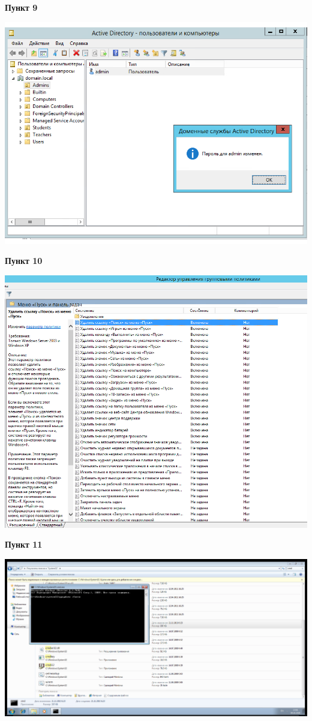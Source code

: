 \documentclass[a4paper,14pt]{extarticle}
\begin{document}
    \newpage
    \textbf{Пункт 9}
    \begin{center}
        \includegraphics[scale=0.6]{9}
    \end{center}
    \textbf{Пункт 10}
    \begin{center}
        \includegraphics[scale=0.6]{10}
    \end{center}
    \newpage
    \textbf{Пункт 11}
    \begin{center}
        \includegraphics[scale=0.4]{11}
    \end{center}
\end{document}
